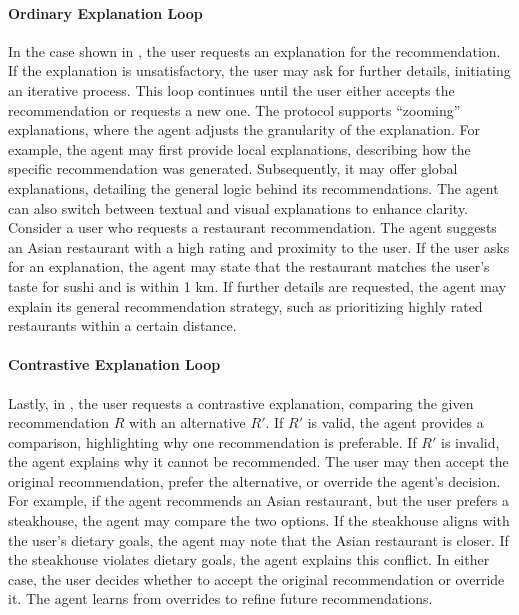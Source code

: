 %
\paragraph{Ordinary Explanation Loop}
%
In the case shown in , the user requests an explanation for the recommendation.
%
If the explanation is unsatisfactory, the user may ask for further details, initiating an iterative process.
%
This loop continues until the user either accepts the recommendation or requests a new one.
%
The protocol supports ``zooming'' explanations, where the agent adjusts the granularity of the explanation.
%
For example, the agent may first provide local explanations, describing how the specific recommendation was generated.
%
Subsequently, it may offer global explanations, detailing the general logic behind its recommendations.
%
The agent can also switch between textual and visual explanations to enhance clarity.
%
Consider a user who requests a restaurant recommendation.
%
The agent suggests an Asian restaurant with a high rating and proximity to the user.
%
If the user asks for an explanation, the agent may state that the restaurant matches the user's taste for sushi and is within 1 km.
%
If further details are requested, the agent may explain its general recommendation strategy, such as prioritizing highly rated restaurants within a certain distance.

%
\paragraph{Contrastive Explanation Loop}
%
Lastly, in , the user requests a contrastive explanation, comparing the given recommendation \(R\) with an alternative \(R'\).
%
If \(R'\) is valid, the agent provides a comparison, highlighting why one recommendation is preferable.
%
If \(R'\) is invalid, the agent explains why it cannot be recommended.
%
The user may then accept the original recommendation, prefer the alternative, or override the agent's decision.
%
For example, if the agent recommends an Asian restaurant, but the user prefers a steakhouse, the agent may compare the two options.
%
If the steakhouse aligns with the user's dietary goals, the agent may note that the Asian restaurant is closer.
%
If the steakhouse violates dietary goals, the agent explains this conflict.
%
In either case, the user decides whether to accept the original recommendation or override it.
%
The agent learns from overrides to refine future recommendations.




